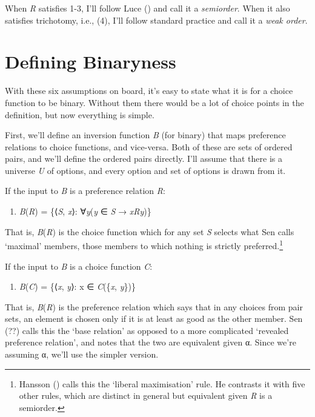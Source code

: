\documentclass[
  11pt,
  letterpaper,
  DIV=11,
  numbers=noendperiod,
  twoside]{scrartcl}
\providecommand{\tightlist}{%
  \setlength{\itemsep}{0pt}\setlength{\parskip}{0pt}}
\begin{document}
When \emph{R} satisfies 1-3, I'll follow Luce
() and call it a \emph{semiorder}. When it
also satisfies trichotomy, i.e., (4), I'll follow standard practice and
call it a \emph{weak order}.

\section{Defining Binaryness}\label{sec-defining}

With these six assumptions on board, it's easy to state what it is for a
choice function to be binary. Without them there would be a lot of
choice points in the definition, but now everything is simple.

First, we'll define an inversion function \emph{B} (for binary) that
maps preference relations to choice functions, and vice-versa. Both of
these are sets of ordered pairs, and we'll define the ordered pairs
directly. I'll assume that there is a universe \emph{U} of options, and
every option and set of options is drawn from it.

If the input to \emph{B} is a preference relation \emph{R}:

\begin{enumerate}
\def\labelenumi{(\arabic{enumi})}
\setcounter{enumi}{6}
\tightlist
\item
  \emph{B}(\emph{R}) = \{⟨\emph{S}, \emph{x}⟩: ∀\emph{y}(\emph{y} ∈
  \emph{S} → \emph{xRy})\}
\end{enumerate}

That is, \emph{B}(\emph{R}) is the choice function which for any set
\emph{S} selects what Sen calls `maximal' members, those members to
which nothing is strictly preferred.\footnote{Hansson
  () calls this the `liberal
  maximisation' rule. He contrasts it with five other rules, which are
  distinct in general but equivalent given \emph{R} is a semiorder.}

If the input to \emph{B} is a choice function \emph{C}:

\begin{enumerate}
\def\labelenumi{(\arabic{enumi})}
\setcounter{enumi}{7}
\tightlist
\item
  \emph{B}(\emph{C}) = \{⟨\emph{x}, \emph{y}⟩: x ∈ \emph{C}(\{\emph{x},
  \emph{y}\})\}
\end{enumerate}

That is, \emph{B}(\emph{R}) is the preference relation which says that
in any choices from pair sets, an element is chosen only if it is at
least as good as the other member. Sen
(??) calls this the `base
relation' as opposed to a more complicated `revealed preference
relation', and notes that the two are equivalent given α. Since we're
assuming α, we'll use the simpler version.
\end{document}
